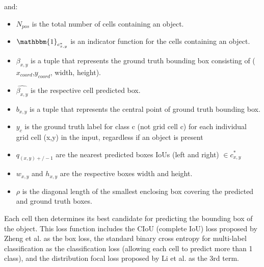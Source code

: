 \documentclass[10pt,twocolumn,letterpaper]{article}
\begin{document}
and:
\begin{itemize}
\item $N_{pos}$ is the total number of cells containing an object.
\item $\mathbbm{1}_{c^*_{x,y}}$ is an indicator function for the cells containing an object. 
\item $\beta_{x,y}$ is a tuple that represents the ground truth bounding box consisting of ($x_{coord}$,$y_{coord}$, width, height).
\item $\hat{\beta_{x,y}}$ is the respective cell predicted box.
\item $b_{x,y}$ is a tuple that represents the central point of ground truth bounding box.
\item $y_c$ is the ground truth label for class c (not grid cell c) for each individual grid cell (x,y) in the input, regardless if an object is present
\item $q_{(x,y)+/- 1}$ are the nearest predicted boxes IoUs (left and right) $\in c^*_{x,y}$
\item $w_{x,y}$ and $h_{x,y}$ are the respective boxes width and height.
\item $\rho$ is the diagonal length of the smallest enclosing box covering the predicted and ground truth boxes.
\end{itemize}

Each cell then determines its best candidate for predicting the bounding box of the object. This loss function includes the CIoU (complete IoU) loss proposed by Zheng et al.\cite{CIoU} as the box loss, the standard binary cross entropy for multi-label classification as the classification loss (allowing each cell to predict more than 1 class), and the distribution focal loss proposed by Li et al.\cite{GFL} as the 3rd term.
\end{document}
